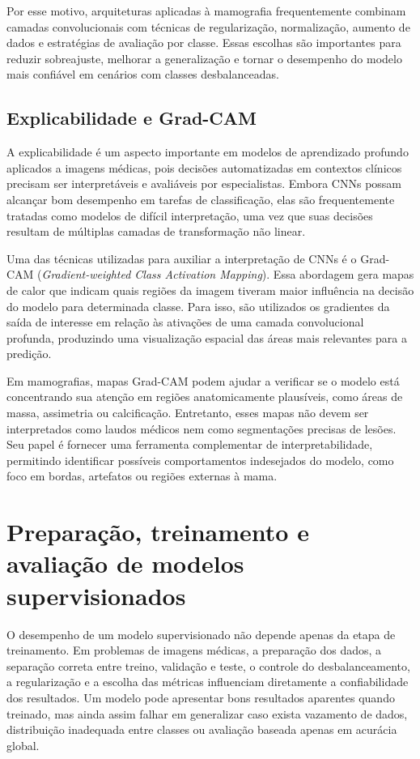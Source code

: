 \documentclass[
    12pt,
    openright,
    oneside,
    a4paper,
    english,
    brazil
]{abntex2}
\begin{document}
Por esse motivo, arquiteturas aplicadas à mamografia frequentemente combinam camadas convolucionais com técnicas de regularização, normalização, aumento de dados e estratégias de avaliação por classe. Essas escolhas são importantes para reduzir sobreajuste, melhorar a generalização e tornar o desempenho do modelo mais confiável em cenários com classes desbalanceadas.

\subsection{Explicabilidade e Grad-CAM}

A explicabilidade é um aspecto importante em modelos de aprendizado profundo aplicados a imagens médicas, pois decisões automatizadas em contextos clínicos precisam ser interpretáveis e avaliáveis por especialistas. Embora CNNs possam alcançar bom desempenho em tarefas de classificação, elas são frequentemente tratadas como modelos de difícil interpretação, uma vez que suas decisões resultam de múltiplas camadas de transformação não linear.

Uma das técnicas utilizadas para auxiliar a interpretação de CNNs é o Grad-CAM (\textit{Gradient-weighted Class Activation Mapping}). Essa abordagem gera mapas de calor que indicam quais regiões da imagem tiveram maior influência na decisão do modelo para determinada classe. Para isso, são utilizados os gradientes da saída de interesse em relação às ativações de uma camada convolucional profunda, produzindo uma visualização espacial das áreas mais relevantes para a predição.


Em mamografias, mapas Grad-CAM podem ajudar a verificar se o modelo está concentrando sua atenção em regiões anatomicamente plausíveis, como áreas de massa, assimetria ou calcificação. Entretanto, esses mapas não devem ser interpretados como laudos médicos nem como segmentações precisas de lesões. Seu papel é fornecer uma ferramenta complementar de interpretabilidade, permitindo identificar possíveis comportamentos indesejados do modelo, como foco em bordas, artefatos ou regiões externas à mama.

\section{Preparação, treinamento e avaliação de modelos supervisionados}

O desempenho de um modelo supervisionado não depende apenas da etapa de treinamento. Em problemas de imagens médicas, a preparação dos dados, a separação correta entre treino, validação e teste, o controle do desbalanceamento, a regularização e a escolha das métricas influenciam diretamente a confiabilidade dos resultados. Um modelo pode apresentar bons resultados aparentes quando treinado, mas ainda assim falhar em generalizar caso exista vazamento de dados, distribuição inadequada entre classes ou avaliação baseada apenas em acurácia global.
\end{document}
